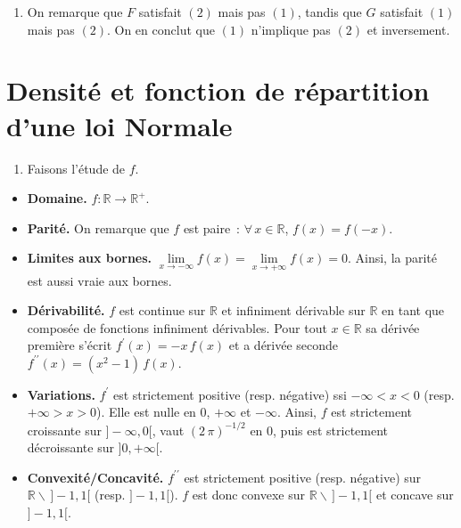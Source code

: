 \begin{enumerate}
\def\labelenumi{\arabic{enumi}.}
\setcounter{enumi}{8}
\tightlist
\item
  On remarque que \(F\) satisfait \((2)\) mais pas \((1)\), tandis que
  \(G\) satisfait \((1)\) mais pas \((2)\). On en conclut que \((1)\)
  n'implique pas \((2)\) et inversement.
\end{enumerate}

\section{Densité et fonction de répartition d'une loi
Normale}\label{I-densituxe9-et-fonction-de-ruxe9partition-dune-loi-normale-1}

\label{I-answer-fdrgaussprop}

\begin{enumerate}
\def\labelenumi{\arabic{enumi}.}
\tightlist
\item
  Faisons l'étude de \(f\).
\end{enumerate}

\begin{itemize}
\tightlist
\item
  \textbf{Domaine.} \(f : \mathbb{R}\to \mathbb{R}^+\).
\item
  \textbf{Parité.} On remarque que \(f\) est paire~:
  \(\forall\,x\in\mathbb{R}\), \(f(x) = f(-x)\).
\item
  \textbf{Limites aux bornes.}
  \(\lim\limits_{x\to-\infty} f(x) = \lim\limits_{x\to+\infty} f(x) = 0\).
  Ainsi, la parité est aussi vraie aux bornes.
\item
  \textbf{Dérivabilité.} \(f\) est continue sur \(\mathbb{R}\) et
  infiniment dérivable sur \(\mathbb{R}\) en tant que composée de
  fonctions infiniment dérivables. Pour tout \(x\in\mathbb{R}\) sa
  dérivée première s'écrit \(f^\prime(x) = -x\,f(x)\) et a dérivée
  seconde \(f^{\prime\prime}(x) =(x^2 - 1)\,f(x)\).
\item
  \textbf{Variations.} \(f^\prime\) est strictement positive (resp.
  négative) ssi \(-\infty < x < 0\) (resp. \(+\infty > x > 0\)). Elle
  est nulle en \(0\), \(+\infty\) et \(-\infty\). Ainsi, \(f\) est
  strictement croissante sur \(]-\infty,0[\), vaut
  \(\left(2\,\pi\right)^{-1/2}\) en \(0\), puis est strictement
  décroissante sur \(]0,+\infty[\).
\item
  \textbf{Convexité/Concavité.} \(f^{\prime\prime}\) est strictement
  positive (resp. négative) sur \(\mathbb{R}\backslash\,]-1,1[\) (resp.
  \(]-1,1[\)). \(f\) est donc convexe sur
  \(\mathbb{R}\backslash\,]-1,1[\) et concave sur \(]-1,1[\).
\end{itemize}

